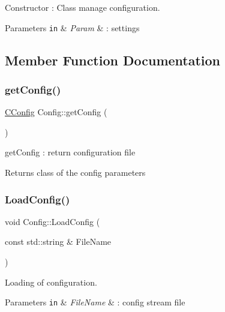 Constructor \+: Class manage configuration. 


\begin{DoxyParams}[1]{Parameters}
\mbox{\tt in}  & {\em Param} & \+: settings \\
\hline
\end{DoxyParams}


\subsection{Member Function Documentation}
\mbox{\label{class_config_a69e6510655afcb2b86e772cb67cb807a}} 
\subsubsection{\texorpdfstring{get\+Config()}{getConfig()}}
{\footnotesize\ttfamily \hyperlink{struct_c_config}{C\+Config} Config\+::get\+Config (\begin{DoxyParamCaption}{ }\end{DoxyParamCaption})}



get\+Config \+: return configuration file 

\begin{DoxyReturn}{Returns}
class of the config parameters 
\end{DoxyReturn}
\mbox{\label{class_config_aece9ad7b2f011e211ae9c82a7ae506bc}} 
\subsubsection{\texorpdfstring{Load\+Config()}{LoadConfig()}}
{\footnotesize\ttfamily void Config\+::\+Load\+Config (\begin{DoxyParamCaption}\item[{const std\+::string \&}]{File\+Name }\end{DoxyParamCaption})}



Loading of configuration. 


\begin{DoxyParams}[1]{Parameters}
\mbox{\tt in}  & {\em File\+Name} & \+: config stream file \\
\hline
\end{DoxyParams}
\mbox{\label{class_config_a554ca6c693d22e88fdc0a1e78eac0daf}} 

